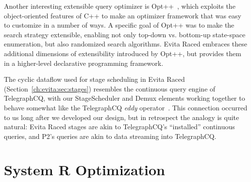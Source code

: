 Another interesting extensible query optimizer is Opt++~\cite{kabradewitt},
which exploits the object-oriented features of C++ to make an optimizer
framework that was easy to customize in a number of ways.  A specific goal of
Opt++ was to make the search strategy extensible, enabling not only top-down
vs.  bottom-up state-space enumeration, but also randomized search algorithms.
Evita Raced embraces these additional dimensions of extensibility introduced by
Opt++, but provides them in a higher-level declarative programming framework.

The cyclic dataflow used for stage scheduling in Evita Raced
(Section~\ref{ch:evita:sec:stages}) resembles the continuous query engine of
TelegraphCQ, with our StageScheduler and Demux elements working together to
behave somewhat like the TelegraphCQ {\em eddy} operator~\cite{tcq-cidr}.  This
connection occurred to us long after we developed our design, but in retrospect
the analogy is quite natural: Evita Raced stages are akin to TelegraphCQ's
``installed'' continuous queries, and P2's \OVERLOG queries are akin to data
streaming into TelegraphCQ.


\section{System R Optimization}
\label{ch:evita:sec:systemr}

